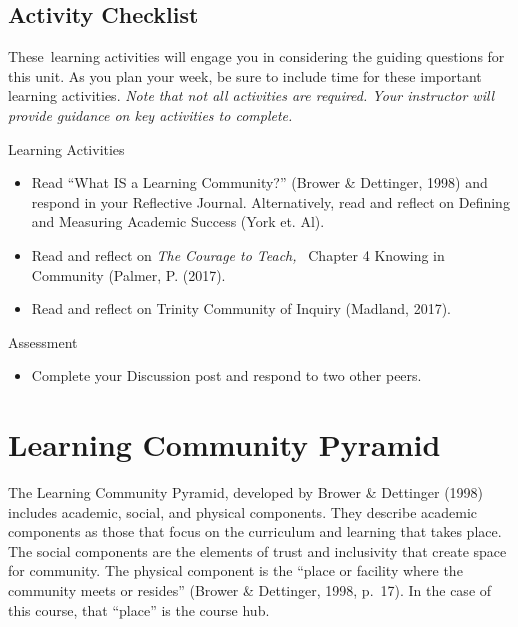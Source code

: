\documentclass[
]{book}
\providecommand{\tightlist}{%
  \setlength{\itemsep}{0pt}\setlength{\parskip}{0pt}}
\begin{document}
\hypertarget{activity-checklist-3}{%
\subsection*{Activity Checklist}\label{activity-checklist-3}}

These~learning activities will engage you in considering the guiding questions for this unit. As you plan your week, be sure to include time for these important learning activities. \emph{Note that not all activities are required. Your instructor will provide guidance on key activities to complete.}

\begin{reflect}
{Learning Activities}

\begin{itemize}
\tightlist
\item
  Read ``What IS a Learning Community?'' (Brower \& Dettinger, 1998) and
  respond in your Reflective Journal. Alternatively, read and reflect on
  Defining and Measuring Academic Success (York et. Al).\\
\item
  Read and reflect on \emph{The Courage to Teach,} ~Chapter 4 Knowing in
  Community (Palmer, P. (2017).\\
\item
  Read and reflect on Trinity Community of Inquiry (Madland, 2017).
\end{itemize}
\end{reflect}

\begin{assessment}
{Assessment}

\begin{itemize}
\tightlist
\item
  Complete your Discussion post and respond to two other peers.
\end{itemize}
\end{assessment}

\hypertarget{learning-community-pyramid}{%
\section{Learning Community Pyramid}\label{learning-community-pyramid}}

The Learning Community Pyramid, developed by Brower \& Dettinger (1998) includes academic, social, and physical components. They describe academic components as those that focus on the curriculum and learning that takes place. The social components are the elements of trust and inclusivity that create space for community. The physical component is the ``place or facility where the community meets or resides'' (Brower \& Dettinger, 1998, p.~17). In the case of this course, that ``place'' is the course hub.
\end{document}
